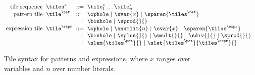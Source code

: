 \begin{figure}
  \vspace{-3px}
  \[\arraycolsep=3pt\begin{array}{rlrl}
    \text{tile sequence} & \tiles^s & ::= & \tile^s_1\dots\tile^s_n \\
    \text{pattern tile} & \tile^{\pat} & ::= &
      \ophole ~\vert~
      \svar{x} ~\vert~
      \sparen{\tiles^{\pat}} \\
    & & \vert &
      \binhole ~\vert~
      \sprod{}{} \\
    \text{expression tile} & \tile^{\expr} & ::= &
      \ophole ~\vert~
      \snumlit{n} ~\vert~
      \svar{x} ~\vert~
      \sparen{\tiles^{\expr}} \\
    & & \vert &
      \binhole ~\vert~
      \splus{}{} ~\vert~
      \smult{}{} ~\vert~
      \sdiv{}{} ~\vert~
      \sprod{}{} \\
    & & \vert &
      \slam{\tiles^{\pat}}{} ~\vert~
      \slet{\tiles^{\pat}}{\tiles^{\expr}}{}
  \end{array}\]
  \caption{Tile syntax for patterns and expressions, where
  $x$ ranges over variables and $n$ over number literals.}
  \label{fig:tile-syntax}
\end{figure}
